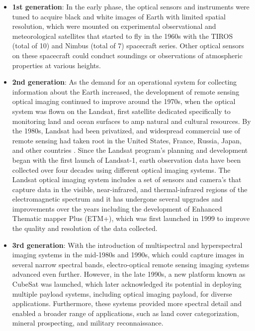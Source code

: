 \documentclass[final,5p,times,twocolumn,authoryear]{elsarticle}
\begin{document}
\begin{itemize}
	\item \textbf{1st generation}: In the early phase, the optical sensors and instruments were tuned to acquire black and white images of Earth with limited spatial resolution, which were mounted on experimental observational and meteorological satellites that started to fly in the 1960s \citep{nicholas1999} with the TIROS (total of 10) and Nimbus (total of 7) spacecraft series. Other optical sensors on these spacecraft could conduct soundings or observations of atmospheric properties at various heights.
	\item \textbf{2nd generation}: As the demand for an operational system for collecting information about the Earth increased, the development of remote sensing optical imaging continued to improve around the 1970s, when the optical system was flown on the Landsat, first satellite dedicated specifically to monitoring land and ocean surfaces to amp natural and cultural resources. By the 1980s, Landsat had been privatized, and widespread commercial use of remote sensing had taken root in the United States, France, Russia, Japan, and other countries \citep{nicholas1999}. Since the Landsat program's planning and development began with the first launch of Landsat-1, earth observation data have been collected over four decades \citep{wulder2019current} using different optical imaging systems. The Landsat optical imaging system includes a set of sensors and camera's that capture data in the visible, near-infrared, and thermal-infrared regions of the electromagnetic spectrum and it has undergone several upgrades and improvements over the years including the development of Enhanced Thematic mapper Plus (ETM+), which was first launched in 1999 to improve the quality and resolution of the data collected. 
	\item \textbf{3rd generation}: With the introduction of multispectral and hyperspectral imaging systems in the mid-1980s and 1990s, which could capture images in several narrow spectral bands, electro-optical remote sensing imaging systems advanced even further. However, in the late 1990s, a new platform known as CubeSat was launched, which later acknowledged its potential \citep{poghosyan2017cubesat} in deploying multiple payload systems, including optical imaging payload, for diverse applications. Furthermore, these systems provided more spectral detail and enabled a broader range of applications, such as land cover categorization, mineral prospecting, and military reconnaissance. 

\end{itemize}
\end{document}
